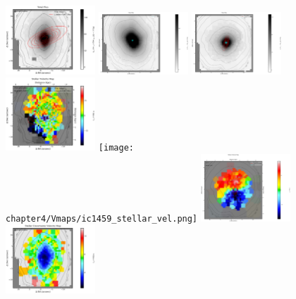 \begin{figure}
      \centering
      \includegraphics[width=0.3\textwidth]{chapter4/Vmaps/eso443-g024_stellar_img.png}
      \includegraphics[width=0.3\textwidth]{chapter4/Vmaps/ic1459_stellar_img.png}
      \includegraphics[width=0.3\textwidth]{chapter4/Vmaps/ic1531_stellar_img.png}
      \\
      \includegraphics[width=0.3\textwidth]{chapter4/Vmaps/eso443-g024_stellar_vel.png}
      \texttt{[image: chapter4/Vmaps/ic1459\_stellar\_vel.png]}
      \includegraphics[width=0.3\textwidth]{chapter4/Vmaps/ic1531_stellar_vel.png}
      \\
      \includegraphics[width=0.3\textwidth]{chapter4/Vmaps/eso443-g024_stellar_vel_uncert.png}

\end{figure}
